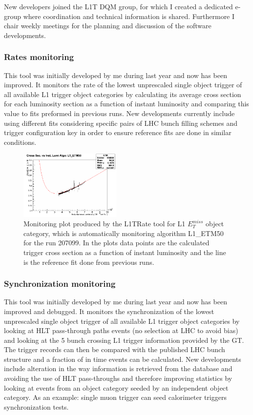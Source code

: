 \documentclass[%
reprint,
amsmath,
amssymb,
aps,
pra,
showkeys
]{revtex4-1}
\begin{document}
New developers joined the L1T DQM group, for which I created a dedicated e-group where coordination and technical
information is shared. Furthermore I chair weekly meetings for the planning and discussion of the software developments.

\subsubsection{Rates monitoring}

This tool was initially developed by me during last year and now has been improved. It monitors the rate of the
lowest unprescaled single object trigger of all available L1 trigger object categories by calculating its
average cross section for each luminosity section as a function of instant luminosity and comparing this value to
fits preformed in previous runs. New developments currently include using different fits considering specific pairs of
LHC bunch filling schemes and trigger configuration key in order to ensure reference fits are done in similar conditions.

\begin{figure}[ht]
\centering
\includegraphics[width=0.45\textwidth]{img/L1TRate_L1_ETM50.png}
\caption{Monitoring plot produced by the L1TRate tool for L1 $E_T^{miss}$ object category, which is automatically
monitoring algorithm L1\_ETM50 for the run 207099. In the plots data points are the calculated trigger cross
section as a function of instant luminosity and the line is the reference fit done from previous runs.}
\label{figure_ServiceWork_L1TRate}
\end{figure}

\subsubsection{Synchronization monitoring}

This tool was initially developed by me during last year and now has been improved and debugged. It monitors
the synchronization of the lowest unprescaled single object trigger of all available L1 trigger object categories
by looking at HLT pass-through paths events (no selection at LHC to avoid bias) and looking at the 5 bunch crossing
L1 trigger information provided by the GT. The trigger records can then be compared with the published LHC bunch
structure and a fraction of in time events can be calculated. New developments include alteration in the way
information is retrieved from the database and avoiding the use of HLT pass-throughs and therefore improving statistics
by looking at events from an object category seeded by an independent object category. As an example: single muon
trigger can seed calorimeter triggers synchronization tests.
\end{document}
